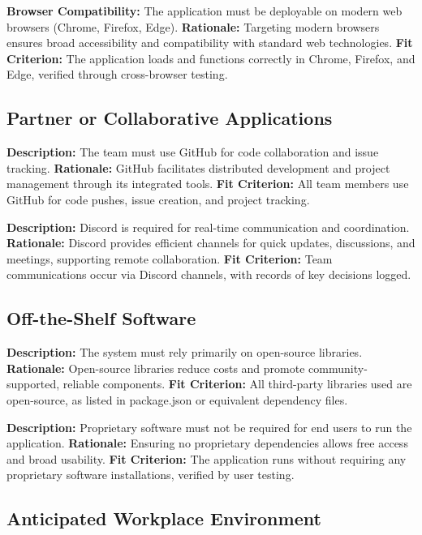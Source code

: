 \documentclass[12pt]{article}
\begin{document}
\textbf{Browser Compatibility:} The application must be deployable on modern web browsers (Chrome, Firefox, Edge).
\textbf{Rationale:} Targeting modern browsers ensures broad accessibility and compatibility with standard web technologies.
\textbf{Fit Criterion:} The application loads and functions correctly in Chrome, Firefox, and Edge, verified through cross-browser testing.

\subsection{Partner or Collaborative Applications}

\textbf{Description:} The team must use GitHub for code collaboration and issue tracking.
\textbf{Rationale:} GitHub facilitates distributed development and project management through its integrated tools.
\textbf{Fit Criterion:} All team members use GitHub for code pushes, issue creation, and project tracking.

\textbf{Description:} Discord is required for real-time communication and coordination.
\textbf{Rationale:} Discord provides efficient channels for quick updates, discussions, and meetings, supporting remote collaboration.
\textbf{Fit Criterion:} Team communications occur via Discord channels, with records of key decisions logged.

\subsection{Off-the-Shelf Software}

\textbf{Description:} The system must rely primarily on open-source libraries.
\textbf{Rationale:} Open-source libraries reduce costs and promote community-supported, reliable components.
\textbf{Fit Criterion:} All third-party libraries used are open-source, as listed in package.json or equivalent dependency files.

\textbf{Description:} Proprietary software must not be required for end users to run the application.
\textbf{Rationale:} Ensuring no proprietary dependencies allows free access and broad usability.
\textbf{Fit Criterion:} The application runs without requiring any proprietary software installations, verified by user testing.

\subsection{Anticipated Workplace Environment}
\end{document}
